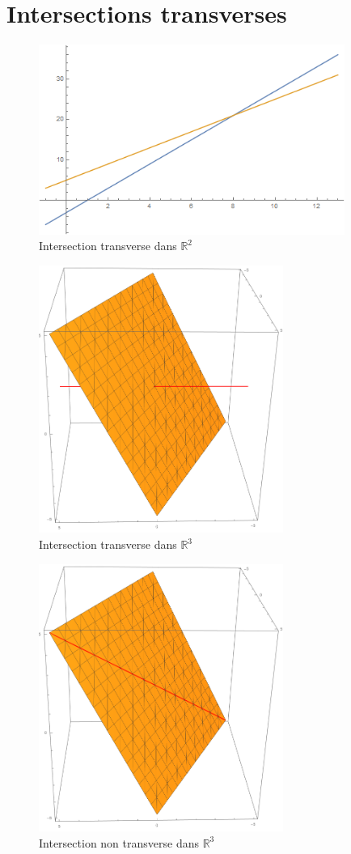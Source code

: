\documentclass[a4paper]{article}
\newcommand{\R}{\mathbb{R}}
\theoremstyle{definition}
\begin{document}
\section{Intersections transverses}
\begin{figure}[H]
	\centering
	\includegraphics[width=10cm,keepaspectratio]{images/2DTransverse.png}
	\caption{Intersection transverse dans $\R^2$}
\end{figure}
\begin{figure}[H]
	\centering
	\includegraphics[width=8cm,keepaspectratio]{images/3D_trans.png}
	\caption{Intersection transverse dans $\R^3$}
\end{figure}
\begin{figure}[H]
	\centering
	\includegraphics[width=8cm,keepaspectratio]{images/3D_non_trans.png}
	\caption{Intersection non transverse dans $\R^3$}
\end{figure}
\end{document}
